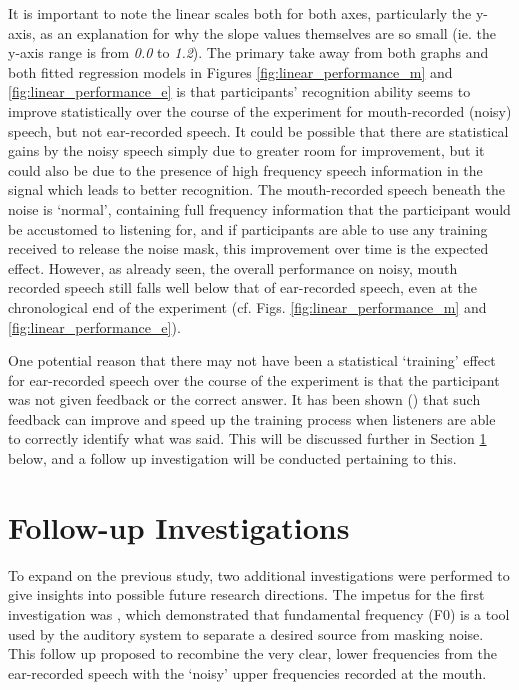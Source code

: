It is important to note the linear scales both for both axes, particularly the y-axis, as an explanation for why the slope values themselves are so small (ie. the y-axis range is from \textit{0.0} to \textit{1.2}).  The primary take away from both graphs and both fitted regression models in Figures \ref{fig:linear_performance_m} and \ref{fig:linear_performance_e} is that participants' recognition ability seems to improve statistically over the course of the experiment for mouth-recorded (noisy) speech, but not ear-recorded speech.  It could be possible that there are statistical gains by the noisy speech simply due to greater room for improvement, but it could also be due to the presence of high frequency speech information in the signal which leads to better recognition. The mouth-recorded speech beneath the noise is `normal', containing full frequency information that the participant would be accustomed to listening for, and if participants are able to use any training received to release the noise mask, this improvement over time is the expected effect.  However, as already seen, the overall performance on noisy, mouth recorded speech still falls well below that of ear-recorded speech, even at the chronological end of the experiment (cf. Figs. \ref{fig:linear_performance_m} and \ref{fig:linear_performance_e}).

One potential reason that there may not have been a statistical `training' effect for ear-recorded speech over the course of the experiment is that the participant was not given feedback or the correct answer.  It has been shown (\cite{davis:05}) that such feedback can improve and speed up the training process when listeners are able to correctly identify what was said.  This will be discussed further in Section \ref{chap3:follow-up-expts} below, and a follow up investigation will be conducted pertaining to this.


\section{Follow-up Investigations}
\label{chap3:follow-up-expts}

To expand on the previous study, two additional investigations were performed to give insights into possible future research directions.  The impetus for the first investigation was \cite{bird:97}, which demonstrated that fundamental frequency (F0) is a tool used by the auditory system to separate a desired source from masking noise.  This follow up proposed to recombine the very clear, lower frequencies from the ear-recorded speech with the `noisy' upper frequencies recorded at the mouth.  

